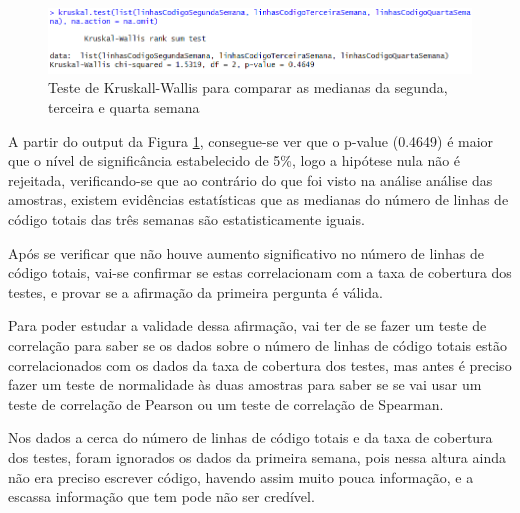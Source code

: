 \documentclass[%
 aip,
cp,  %
 amsmath,amssymb,%
 reprint,%
]{revtex4-2}
\begin{document}
\begin{figure}[!h]
    \centering
    \includegraphics[width=0.9\linewidth]{imagens//questao2/testeKruskaWallis.png}
    \caption{ Teste de Kruskall-Wallis para comparar as medianas da segunda, terceira e quarta semana}
    \label{fig:kruskalWallisTestPergunta2}
\end{figure}

A partir do output da Figura \ref{fig:kruskalWallisTestPergunta2}, consegue-se ver que o p-value (0.4649) é maior que o nível de significância estabelecido de 5\%, logo a hipótese nula não é rejeitada, verificando-se que ao contrário do que foi visto na análise análise das amostras, existem evidências estatísticas que as medianas do número de linhas de código totais das três semanas são estatisticamente iguais.

Após se verificar que não houve aumento significativo no número de linhas de código totais, vai-se confirmar se estas correlacionam com a taxa de cobertura dos testes, e provar se a afirmação da primeira pergunta é válida.

Para poder estudar a validade dessa afirmação, vai ter de se fazer um teste de correlação para saber se os dados sobre o número de linhas de código totais estão correlacionados com os dados da taxa de cobertura dos testes, mas antes é preciso fazer um teste de normalidade às duas amostras para saber se se vai usar um teste de correlação de Pearson ou um teste de correlação de Spearman.

Nos dados a cerca do número de linhas de código totais e da taxa de cobertura dos testes, foram ignorados os dados da primeira semana, pois nessa altura ainda não era preciso escrever código, havendo assim muito pouca informação, e a escassa informação que tem pode não ser credível.
\end{document}
